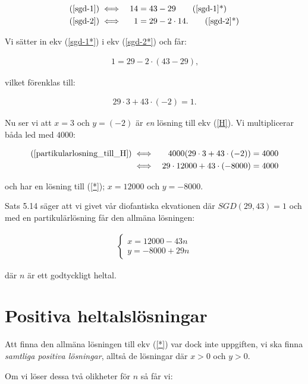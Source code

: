 \documentclass{article}
\begin{document}
\begin {align*}
  (\text{\ref{sgd-1}}) &\iff &14 &= 43 - 29 \label{sgd-1*}\tag{\ref{sgd-1}*}\\
  (\text{\ref{sgd-2}}) &\iff &1 &= 29 - 2 \cdot 14\text{.} \label{sgd-2*}\tag{\ref{sgd-2}*}
\end{align*}

Vi sätter in ekv (\ref{sgd-1*}) i ekv (\ref{sgd-2*}) och får:

\begin{gather*}
  1 = 29 - 2 \cdot (43 - 29)\text{,}
\end{gather*}

vilket förenklas till:

\begin{gather}
  29 \cdot 3 + 43 \cdot (-2) = 1\text{.} \label{partikularlosning_till_H}
\end{gather}

Nu ser vi att $x = 3$ och $y = (-2)$ är \emph{en} lösning till ekv (\ref{H}). Vi multiplicerar båda led med $4000$:

\begin{align*}
  \text{(\ref{partikularlosning_till_H})} &\iff &4000(29 \cdot 3 + 43 \cdot (-2)) = 4000 \\
  &\iff &29 \cdot 12000 + 43 \cdot (-8000) = 4000
\end{align*}

och har en lösning till (\ref{*}); $x = 12000$ och $y = -8000$.

Sats 5.14 säger att vi givet vår diofantiska ekvationen där $SGD(29, 43) = 1$ och med en partikulärlösning får den allmäna lösningen:

\begin{gather*}
  \begin{cases}
    x = 12000 - 43n \\
    y = -8000 + 29n
  \end{cases}
\end{gather*}

där $n$ är ett godtyckligt heltal.


\section*{Positiva heltalslösningar}

Att finna den allmäna lösningen till ekv (\ref{*}) var dock inte uppgiften, vi ska finna \emph{samtliga positiva lösningar}, alltså de lösningar där $x > 0$ och $y > 0$.

Om vi löser dessa två olikheter för $n$ så får vi:
\end{document}
